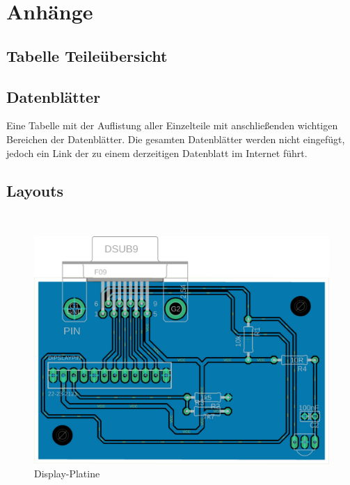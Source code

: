 \documentclass[11pt, titlepage, fleqn]{report}
\begin{document}
	\chapter{Anhänge}
		\section{Tabelle Teileübersicht}
		\section{Datenblätter}
			Eine Tabelle mit der Auflistung aller Einzelteile mit anschließenden wichtigen Bereichen der Datenblätter.
			Die gesamten Datenblätter werden nicht eingefügt, jedoch ein Link der zu einem derzeitigen Datenblatt im Internet führt.
		\newpage
		\section{Layouts}
			~
			~
			\begin{figure}[!htbp]
				\centering
				\includegraphics[height=0.9\linewidth ,angle=90]{./docs/Display_LayoutW.pdf}
				\caption{Display-Platine}
			\end{figure}
			\newpage
			~
			~
			~
\end{document}
